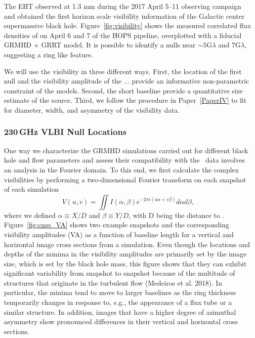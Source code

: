 The EHT observed \sgra at 1.3 mm during the 2017 April 5--11 observing campaign and obtained
the first horizon scale visibility information of the Galactic center supermassive black hole.
Figure~\ref{fig:visibility} shows the measured correlated flux densities of \sgra on April 6
and 7 of the HOPS pipeline, overplotted with a fiducial GRMHD + GRRT model.
It is possible to identify a nulls near $\sim 5\mathrm{G}\lambda$ and $7\mathrm{G}\lambda$,
suggesting a ring like feature.

We will use the visibility in three different ways.
First, the location of the first null and the visibility amplitude of the ... provide an informative non-parametric constraint of the models.
Second, the short baseline provide a quantitative size estimate of the source.
Third, we follow the procedure in Paper~\ref{PaperIV} to fit for diameter, width, and asymmetry of the visibility data.

\subsubsection{230\,GHz VLBI Null Locations}


One way we characterize the GRMHD simulations carried out for
different black hole and flow parameters and assess their
compatibility with the \sgra\ data involves an analysis in the Fourier
domain.
To this end, we first calculate the complex visibilities by performing
a two-dimensional Fourier transform on each snapshot of each
simulation
\begin{equation}
  V(u,v) = \iint I(\alpha,\beta) e^{-2\pi i(u\alpha+v\beta)}d\alpha d\beta,
\end{equation}
where we defined $\alpha \equiv X/D$ and $\beta \equiv Y/D$, with D
being the distance to \sgra.
Figure~\ref{fig:cmp_VA} shows two example snapshots and the
corresponding visibility amplitudes (VA) as a function of baseline
length for a vertical and horizontal image cross sections from a
simulation.
Even though the locations and depths of the minima in the visibility
amplitudes are primarily set by the image size, which is set by the
black hole mass, this figure shows that they can exhibit significant
variability from snapshot to snapshot because of the multitude of
structures that originate in the turbulent flow (Medeiros et
al. 2018).
In particular, the minima tend to move to larger baselines as the ring
thickness temporarily changes in response to, e.g., the appearance of
a flux tube or a similar structure.
In addition, images that have a higher degree of azimuthal asymmetry
show pronounced differences in their vertical and horizontal cross
sections.

